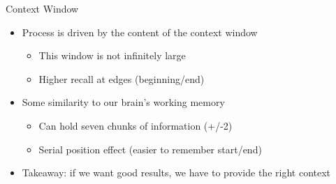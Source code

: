 \documentclass[
ps,
]{prosper}
\begin{document}
\begin{slide}{Context Window}

\begin{itemize}

\item Process is driven by the content of the context window

  \begin{itemize}
  
  \item This window is not infinitely large
    
  \item Higher recall at edges (beginning/end)

\end{itemize}
  
\item Some similarity to our brain's working memory

  \begin{itemize}

  \item Can hold seven chunks of information (+/-2)

  \item Serial position effect (easier to remember start/end)
    
  \end{itemize}

\end{itemize}

\vspace*{.5cm}

\begin{itemize}
  
\item Takeaway: if we want good results, we have to provide the right context
  
\end{itemize}
  
\end{slide}
\end{document}
